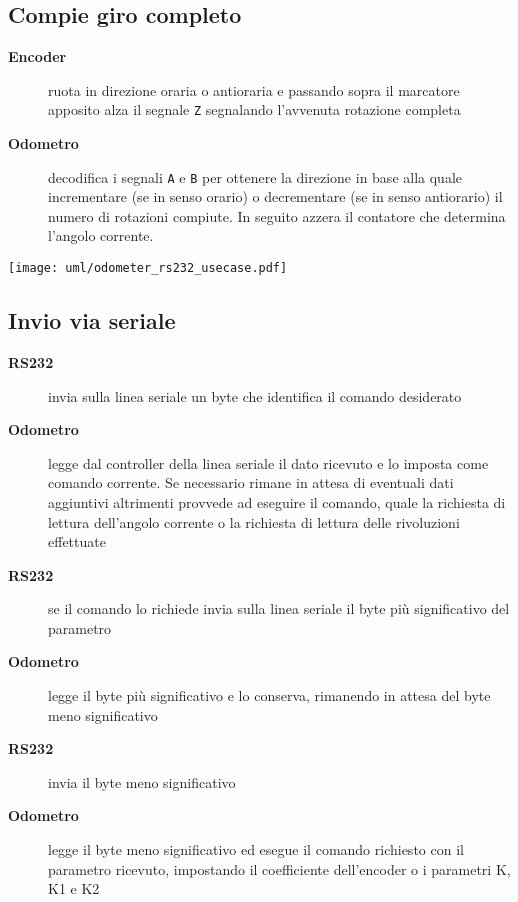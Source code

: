 \documentclass [11pt,a4paper,oneside]{paper}
\newcommand{\actor}[1]{\textbf{#1}}
\newcommand{\identifier}[1]{\texttt{#1}}
\begin{document}
\subsection{Compie giro completo}
\begin{description}
\item[\actor{Encoder}] ruota in direzione oraria o antioraria e
    passando sopra il marcatore apposito alza il segnale \identifier{Z}
    segnalando l'avvenuta rotazione completa
\item[\actor{Odometro}] decodifica i segnali \identifier{A} e
    \identifier{B} per ottenere la direzione in base alla quale
    incrementare (se in senso orario) o decrementare (se in senso
    antiorario) il numero di rotazioni compiute.
    In seguito azzera il contatore che determina l'angolo corrente.
\end{description}

\begin{center}
    \texttt{[image: uml/odometer\_rs232\_usecase.pdf]}
    \label{rs232_usecase}
\end{center}

\subsection{Invio via seriale}
\begin{description}
\item[\actor{RS232}] invia sulla linea seriale un byte che identifica il
    comando desiderato
\item[\actor{Odometro}] legge dal controller della linea seriale il dato
    ricevuto e lo imposta come comando corrente. Se necessario rimane in
    attesa di eventuali dati aggiuntivi altrimenti provvede ad eseguire
    il comando, quale la richiesta di lettura dell'angolo corrente o
    la richiesta di lettura delle rivoluzioni effettuate
\item[\actor{RS232}] se il comando lo richiede invia sulla linea seriale
    il byte più significativo del parametro
\item[\actor{Odometro}] legge il byte più significativo e lo conserva, 
    rimanendo in attesa del byte meno significativo
\item[\actor{RS232}] invia il byte meno significativo
\item[\actor{Odometro}] legge il byte meno significativo ed esegue
    il comando richiesto con il parametro ricevuto, impostando
    il coefficiente dell'encoder o i parametri K, K1 e K2
\end{description}
\end{document}
